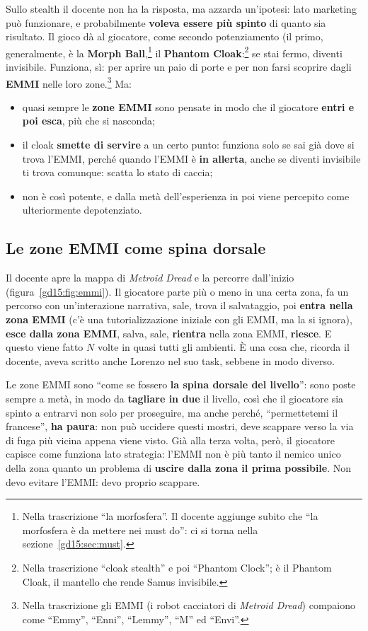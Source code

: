 Sullo stealth il docente non ha la risposta, ma azzarda un'ipotesi: lato
marketing può funzionare, e probabilmente \textbf{voleva essere più spinto}
di quanto sia risultato. Il gioco dà al giocatore, come secondo potenziamento
(il primo, generalmente, è la \textbf{Morph Ball},\footnote{Nella
trascrizione ``la morfosfera''. Il docente aggiunge subito che ``la
morfosfera è da mettere nei must do'': ci si torna nella
sezione~\ref{gd15:sec:must}.} il \textbf{Phantom Cloak}:\footnote{Nella
trascrizione ``cloak stealth'' e poi ``Phantom Clock''; è il Phantom Cloak,
il mantello che rende Samus invisibile.} se stai fermo, diventi invisibile.
Funziona, sì: per aprire un paio di porte e per non farsi scoprire dagli
\textbf{EMMI} nelle loro zone.\footnote{Nella trascrizione gli EMMI (i robot
cacciatori di \emph{Metroid Dread}) compaiono come ``Emmy'', ``Enni'',
``Lemmy'', ``M'' ed ``Envi''.} Ma:
\begin{itemize}
  \item quasi sempre le \textbf{zone EMMI} sono pensate in modo che il
        giocatore \textbf{entri e poi esca}, più che si nasconda;
  \item il cloak \textbf{smette di servire} a un certo punto: funziona solo
        se sai già dove si trova l'EMMI, perché quando l'EMMI è \textbf{in
        allerta}, anche se diventi invisibile ti trova comunque: scatta lo
        stato di caccia;
  \item non è così potente, e dalla metà dell'esperienza in poi viene
        percepito come ulteriormente depotenziato.
\end{itemize}

\subsection{Le zone EMMI come spina dorsale}

Il docente apre la mappa di \emph{Metroid Dread} e la percorre dall'inizio
(figura~\ref{gd15:fig:emmi}). Il giocatore parte più o meno in una certa
zona, fa un percorso con un'interazione narrativa, sale, trova il
salvataggio, poi \textbf{entra nella zona EMMI} (c'è una tutorializzazione
iniziale con gli EMMI, ma la si ignora), \textbf{esce dalla zona EMMI},
salva, sale, \textbf{rientra} nella zona EMMI, \textbf{riesce}. E questo
viene fatto $N$ volte in quasi tutti gli ambienti. È una cosa che, ricorda il
docente, aveva scritto anche Lorenzo nel suo task, sebbene in modo diverso.

Le zone EMMI sono ``come se fossero \textbf{la spina dorsale del livello}'':
sono poste sempre a metà, in modo da \textbf{tagliare in due} il livello, così
che il giocatore sia spinto a entrarvi non solo per proseguire, ma anche
perché, ``permettetemi il francese'', \textbf{ha paura}: non può uccidere
questi mostri, deve scappare verso la via di fuga più vicina appena viene
visto. Già alla terza volta, però, il giocatore capisce come funziona lato
strategia: l'EMMI non è più tanto il nemico unico della zona quanto un
problema di \textbf{uscire dalla zona il prima possibile}. Non devo evitare
l'EMMI: devo proprio scappare.


